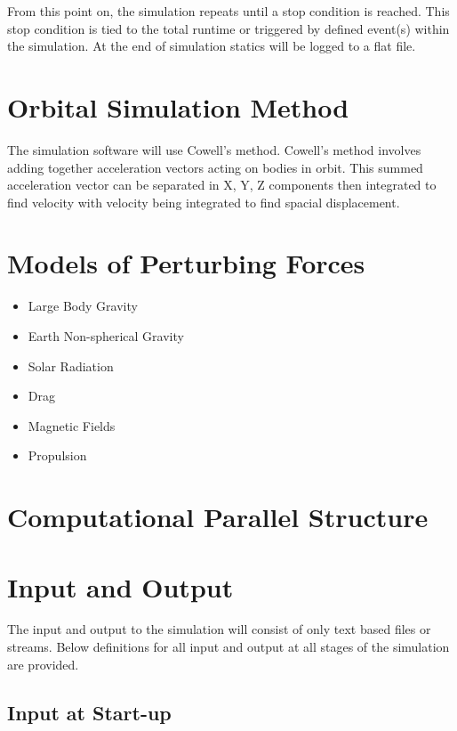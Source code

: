 \documentclass{article}
\begin{document}
  From this point on, the simulation repeats until a stop condition is reached. This stop condition is tied to the total runtime or triggered by defined event(s) within the simulation. At the end of simulation statics will be logged to a flat file.
  
  \section{Orbital Simulation Method}
  
  The simulation software will use Cowell’s method. Cowell’s method involves adding together acceleration vectors acting on bodies in orbit. This summed acceleration vector can be separated in X, Y, Z components then integrated to find velocity with velocity being integrated to find spacial displacement. 
  
  \section{Models of Perturbing Forces}
  
  \begin{itemize}
  	\item Large Body Gravity
  	\item Earth Non-spherical Gravity
  	\item Solar Radiation
  	\item Drag
  	\item Magnetic Fields
  	\item Propulsion
  \end{itemize}
  
  
  \section{Computational Parallel Structure}

  
  \section{Input and Output}
  
The input and output to the simulation will consist of only text based files or streams. Below definitions for all input and output at all stages of the simulation are provided. 
  
  \subsection{Input at Start-up}
  
\end{document}

